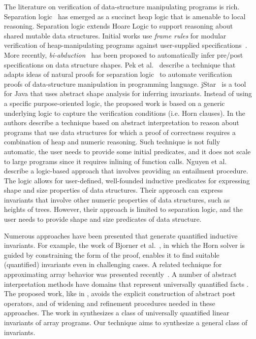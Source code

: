 The literature on verification of data-structure manipulating 
programs is rich. Separation logic~\cite{Reynolds02,IshtiaqO01} has
emerged as a succinct heap logic that is amenable to local
reasoning. Separation logic extends Hoare Logic to support reasoning
about shared mutable data structures. 
Initial works use {\it frame rules} for modular
verification of heap-manipulating programs 
against user-supplied
specifications~\cite{BerdineCO05}.
More recently, {\it
  bi-abduction}~\cite{calcagno2009compositional} 
   has been proposed to automatically
infer pre/post specifications on data structure shapes. Pek
et al.~\cite{PekQM14} describe a technique that adapts ideas of
natural proofs for separation logic~\cite{Qiu0SM13} to automate
verification proofs of data-structure manipulation in programming
language. jStar~\cite{DistefanoP08} is a tool for Java that uses
abstract shape analysis for inferring invariants. Instead of using a
specific purpose-oriented logic, the proposed work is based on a generic
underlying logic to capture the verification conditions (i.e. Horn
clauses). In \cite{McCloskeyRS10} the authors describe a technique based on
abstract interpretation to reason about programs that use data structures
for which a proof of correctness requires a combination of heap and numeric
reasoning. Such technique is not fully automatic, the user needs to provide some initial 
predicates, and it does not scale to large programs since it requires inlining of 
function calls. 
Nguyen et al.~\cite{NguyenDQC07} describe a logic-based approach that involves providing
an entailment procedure. The logic allows for user-defined, well-founded inductive
predicates for expressing shape and size properties of data structures. Their
approach can express invariants that involve other numeric properties of data
structures, such as heights of trees. However, their approach
is limited to separation logic, and the user needs to provide
shape and size predicates of data structure. 


Numerous approaches have been presented that generate quantified
inductive invariants. For example, the work
of Bjorner et al.\ \cite{BjornerMR13}, in which the Horn solver is
guided by constraining the form of the proof, enables it to find
suitable (quantified) invariants even in challenging cases. A related
technique for approximating array behavior was presented
recently~\cite{DBLP:conf/sas/MonniauxG16}.  A number of abstract
interpretation methods have domains that represent universally
quantified facts \cite{GulwaniMT08,Cousot15}.  The proposed work, like
in \cite{BjornerMR13}, avoids the explicit construction of
abstract post operators, and of widening and refinement procedures needed in
these approaches. The work in \cite{LarrazRR13} synthesizes a class of
universally quantified linear invariants of array programs. Our
technique aims to synthesize a general class of invariants.

